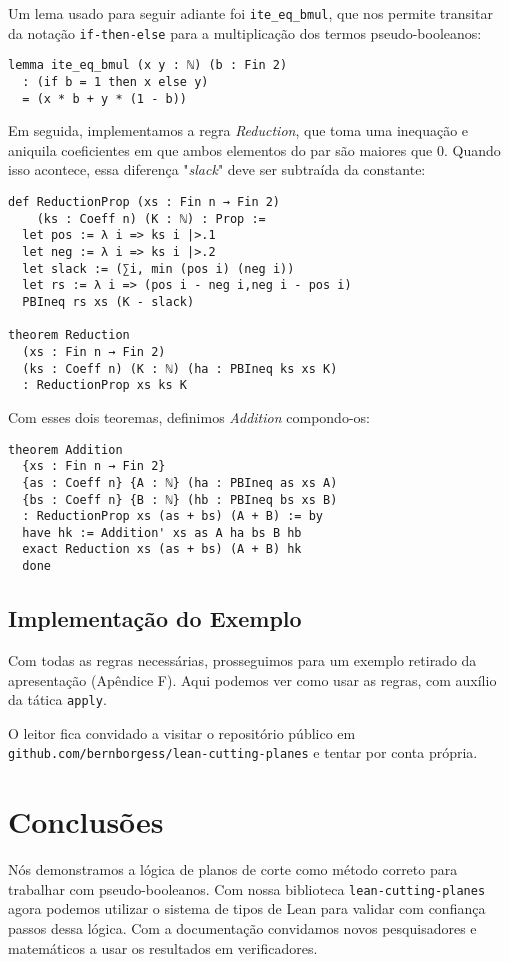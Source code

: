 \documentclass[conference]{IEEEtran}
\begin{document}
Um lema usado para seguir adiante foi \texttt{ite\_eq\_bmul},
que nos permite transitar da notação \texttt{if-then-else}
para a multiplicação dos termos pseudo-booleanos:

\begin{verbatim}
lemma ite_eq_bmul (x y : ℕ) (b : Fin 2)
  : (if b = 1 then x else y)
  = (x * b + y * (1 - b))
\end{verbatim}

Em seguida, implementamos a regra \textit{Reduction}, que toma uma inequação e aniquila coeficientes
em que ambos elementos do par são maiores que $0$.
Quando isso acontece, essa diferença "\textit{slack}" deve ser subtraída da constante:

\begin{verbatim}
def ReductionProp (xs : Fin n → Fin 2)
    (ks : Coeff n) (K : ℕ) : Prop :=
  let pos := λ i => ks i |>.1
  let neg := λ i => ks i |>.2
  let slack := (∑i, min (pos i) (neg i))
  let rs := λ i => (pos i - neg i,neg i - pos i)
  PBIneq rs xs (K - slack)

theorem Reduction
  (xs : Fin n → Fin 2)
  (ks : Coeff n) (K : ℕ) (ha : PBIneq ks xs K)
  : ReductionProp xs ks K
\end{verbatim}

Com esses dois teoremas, definimos \textit{Addition} compondo-os:

\begin{verbatim}
theorem Addition
  {xs : Fin n → Fin 2}
  {as : Coeff n} {A : ℕ} (ha : PBIneq as xs A)
  {bs : Coeff n} {B : ℕ} (hb : PBIneq bs xs B)
  : ReductionProp xs (as + bs) (A + B) := by
  have hk := Addition' xs as A ha bs B hb
  exact Reduction xs (as + bs) (A + B) hk
  done
\end{verbatim}


\newpage
\subsection{Implementação do Exemplo}
Com todas as regras necessárias, prosseguimos para um exemplo retirado da apresentação
(Apêndice F). Aqui podemos ver como usar as regras, com auxílio da tática \texttt{apply}.


O leitor fica convidado a visitar o repositório público em \texttt{github.com/bernborgess/lean-cutting-planes}
e tentar por conta própria.


\section*{Conclusões}
Nós demonstramos a lógica de planos de corte como método correto para trabalhar com pseudo-booleanos.
Com nossa biblioteca \texttt{lean-cutting-planes} agora podemos utilizar o sistema de tipos de Lean
para validar com confiança passos dessa lógica. Com a documentação convidamos novos pesquisadores e
matemáticos a usar os resultados em verificadores.
\end{document}
